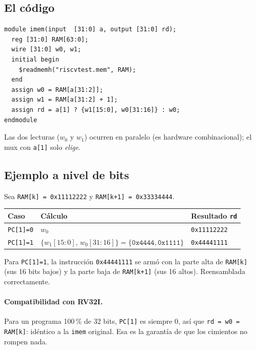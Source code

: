 \documentclass[11pt]{article}
\newcommand{\code}[1]{\texttt{#1}}
\begin{document}
\subsection{El código}

\begin{center}
\begin{minipage}{0.92\linewidth}
\begin{verbatim}
module imem(input  [31:0] a, output [31:0] rd);
  reg [31:0] RAM[63:0];
  wire [31:0] w0, w1;
  initial begin
    $readmemh("riscvtest.mem", RAM);
  end
  assign w0 = RAM[a[31:2]];
  assign w1 = RAM[a[31:2] + 1];
  assign rd = a[1] ? {w1[15:0], w0[31:16]} : w0;
endmodule
\end{verbatim}
\end{minipage}
\end{center}

\noindent
Las dos lecturas ($w_0$ y $w_1$) ocurren en paralelo (es hardware
combinacional); el mux con \code{a[1]} solo \emph{elige}.

\subsection{Ejemplo a nivel de bits}

Sea \code{RAM[k] = 0x11112222} y \code{RAM[k+1] = 0x33334444}.

\begin{center}
\begin{tabular}{@{}lll@{}}
\toprule
Caso & Cálculo & Resultado \code{rd} \\
\midrule
\code{PC[1]=0} & $w_0$ & \code{0x11112222} \\
\code{PC[1]=1} & $\{w_1[15{:}0],\, w_0[31{:}16]\} = \{\code{0x4444},\code{0x1111}\}$ & \code{0x44441111} \\
\bottomrule
\end{tabular}
\end{center}

\noindent
Para \code{PC[1]=1}, la instrucción \code{0x44441111} se armó con la parte alta de
\code{RAM[k]} (sus 16 bits bajos) y la parte baja de \code{RAM[k+1]} (sus 16
altos). Reensamblada correctamente.

\paragraph{Compatibilidad con RV32I.} Para un programa 100\,\% de 32 bits,
\code{PC[1]} es siempre 0, así que \code{rd = w0 = RAM[k]}: idéntico a la
\code{imem} original. Esa es la garantía de que los cimientos no rompen nada.
\end{document}

